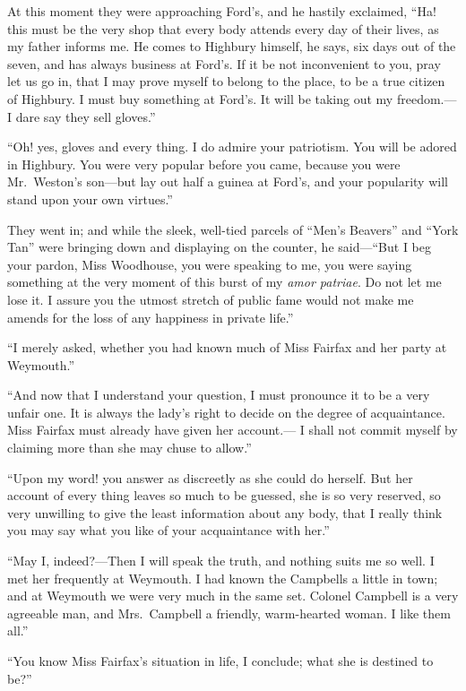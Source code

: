 At this moment they were approaching Ford's, and he hastily exclaimed,
``Ha! this must be the very shop that every body attends every day
of their lives, as my father informs me.  He comes to Highbury himself,
he says, six days out of the seven, and has always business at Ford's.
If it be not inconvenient to you, pray let us go in, that I may prove
myself to belong to the place, to be a true citizen of Highbury.
I must buy something at Ford's. It will be taking out my freedom.---%
I dare say they sell gloves.''

``Oh! yes, gloves and every thing.  I do admire your patriotism.
You will be adored in Highbury.  You were very popular before you came,
because you were Mr.\ Weston's son---but lay out half a guinea at
Ford's, and your popularity will stand upon your own virtues.''

They went in; and while the sleek, well-tied parcels of ``Men's Beavers''
and ``York Tan'' were bringing down and displaying on the counter,
he said---``But I beg your pardon, Miss Woodhouse, you were speaking
to me, you were saying something at the very moment of this burst
of my \emph{amor patriae}.  Do not let me lose it.  I assure you the utmost
stretch of public fame would not make me amends for the loss of any
happiness in private life.''

``I merely asked, whether you had known much of Miss Fairfax
and her party at Weymouth.''

``And now that I understand your question, I must pronounce it to be a
very unfair one.  It is always the lady's right to decide on the degree
of acquaintance.  Miss Fairfax must already have given her account.---%
I shall not commit myself by claiming more than she may chuse to allow.''

``Upon my word! you answer as discreetly as she could do herself.
But her account of every thing leaves so much to be guessed,
she is so very reserved, so very unwilling to give the least
information about any body, that I really think you may say what you
like of your acquaintance with her.''

``May I, indeed?---Then I will speak the truth, and nothing suits me
so well.  I met her frequently at Weymouth.  I had known the Campbells
a little in town; and at Weymouth we were very much in the same set.
Colonel Campbell is a very agreeable man, and Mrs.\ Campbell a friendly,
warm-hearted woman.  I like them all.''

``You know Miss Fairfax's situation in life, I conclude; what she
is destined to be?''

